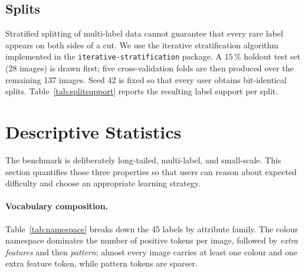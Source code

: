 \documentclass[11pt,a4paper]{article}
\begin{document}
\subsection{Splits}
Stratified splitting of multi-label data cannot guarantee that every
rare label appears on both sides of a cut. We use the iterative
stratification algorithm~\citep{sechidis2011stratification}
implemented in the \texttt{iterative-stratification} package. A
$15\,\%$ holdout test set (28 images) is drawn first; five
cross-validation folds are then produced over the remaining 137
images. Seed 42 is fixed so that every user obtains bit-identical
splits. Table~\ref{tab:splitsupport} reports the resulting label
support per split.

\begin{table}[t]
\centering
\caption{Label support on the shipped splits. Even under iterative
stratification the 28-image holdout unavoidably covers only a
subset of the 45 labels because many labels appear fewer than five
times in the full corpus. Evaluation-active metrics
(Section~\ref{sec:validation}) therefore average over 24 of 45
labels on the holdout, and we make this explicit in every reported
number.}
\label{tab:splitsupport}

\end{table}

\section{Descriptive Statistics}
\label{sec:stats}

The benchmark is deliberately long-tailed, multi-label, and
small-scale. This section quantifies those three properties so
that users can reason about expected difficulty and choose an
appropriate learning strategy.

\paragraph{Vocabulary composition.}
Table~\ref{tab:namespace} breaks down the 45 labels by attribute
family. The colour namespace dominates the number of positive tokens
per image, followed by \emph{extra features} and then \emph{pattern};
almost every image carries at least one colour and one extra feature
token, while pattern tokens are sparser.

\begin{table}[t]
\centering
\caption{Per-namespace breakdown of the 45-entry label vocabulary.
\textit{Mean positives / image} counts how many labels from that
namespace appear on an average image.}
\label{tab:namespace}

\end{table}
\end{document}
